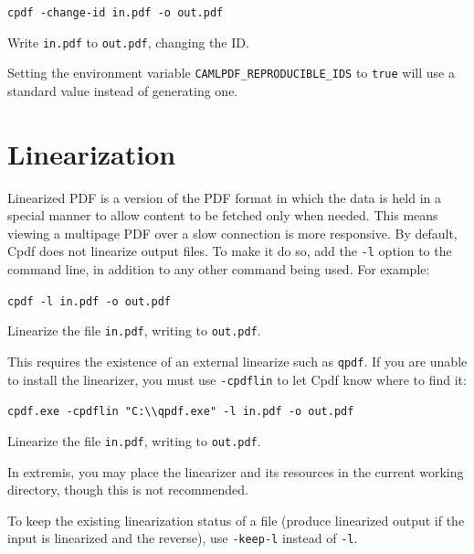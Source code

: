 \documentclass{book}
\begin{document}
\begin{framed}
\noindent\small\verb!cpdf -change-id in.pdf -o out.pdf!

\vspace{2.5mm}
\noindent Write \texttt{in.pdf} to \texttt{out.pdf}, changing the ID.
\end{framed}

\noindent Setting the environment variable \texttt{CAMLPDF\_REPRODUCIBLE\_IDS} to \texttt{true} will use a standard value instead of generating one.

\section{Linearization}
Linearized PDF is a version of the PDF format in which the data is held in a
special manner to allow content to be fetched only when needed. This means
viewing a multipage PDF over a slow connection is more responsive. By default,
Cpdf does not linearize output files. To make it do so, add the \texttt{-l}
option to the command line, in addition to any other command being used. For example:

\begin{framed}
\noindent\small\verb!cpdf -l in.pdf -o out.pdf!

\vspace{2.5mm}
\noindent Linearize the file \texttt{in.pdf}, writing to \texttt{out.pdf}.
\end{framed}

\noindent This requires the existence of an external linearize such as \texttt{qpdf}. If you are unable to install the linearizer, you must use \texttt{-cpdflin} to let Cpdf know where to find it:

\begin{framed}
\noindent\small\verb!cpdf.exe -cpdflin "C:\\qpdf.exe" -l in.pdf -o out.pdf!

\vspace{2.5mm}
\noindent Linearize the file \texttt{in.pdf}, writing to \texttt{out.pdf}.
\end{framed}

\noindent In extremis, you may place the linearizer and its resources in the current working directory, though this is not recommended.

To keep the existing linearization status of a file (produce linearized output if the input is linearized and the reverse), use \texttt{-keep-l} instead of \texttt{-l}.
\end{document}
